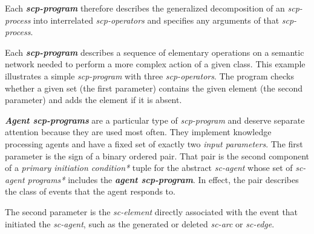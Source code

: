\begin{frame}{}
\topline
\justifying
\vspace{10mm}

Each \textbf{\textit{scp-program}} therefore describes the generalized decomposition of an \textit{\mbox{scp-process}} into interrelated \textit{scp-operators} and specifies any arguments of that \textit{scp-process}.

Each \textbf{\textit{scp-program}} describes a sequence of elementary operations on a semantic network needed to perform a more complex action of a given class.
This example illustrates a simple \textit{scp-program} with three \textit{scp-operators}. The program checks whether a given set (the first parameter) contains the given element (the second parameter) and adds the element if it is absent.
\end{frame}


\begin{frame}{}
\topline
\justifying
\vspace{10mm}

\textbf{\textit{Agent scp-programs}} are a particular type of \textit{scp-program} and deserve separate attention because they are used most often. They implement knowledge processing agents and have a fixed set of exactly two \textit{input parameters\scnrolesign}. The first parameter is the sign of a binary ordered pair. That pair is the second component of a \textit{primary initiation condition*} tuple for the abstract \textit{sc-agent} whose set of \textit{sc-agent programs*} includes the \textbf{\textit{agent scp-program}}. In effect, the pair describes the class of events that the agent responds to.

The second parameter is the \textit{sc-element} directly associated with the event that initiated the \textit{sc-agent}, such as the generated or deleted \textit{sc-arc} or \textit{sc-edge}.
\end{frame}


